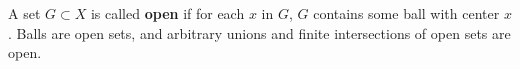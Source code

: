 A set $G \subset X$ is called \textbf{open} if for each $x$ in $G$, $G$ contains some ball with center $x$. Balls are open sets, and arbitrary unions and finite intersections of open sets are open.
